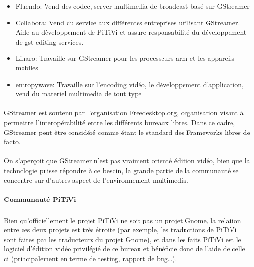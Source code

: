 \begin{itemize}

  \item {Fluendo: Vend des codec, server multimedia de broadcast basé
  sur GStreamer}

  \item {Collabora: Vend du service aux différentes entreprises utilisant
  GStreamer.
    Aide au développement de PiTiVi et assure responsabilité du
    développement de gst-editing-services.}

  \item {Linaro: Travaille sur GStreamer pour les processeurs arm et
  les appareils mobiles}

  \item {entropywave: Travaille sur l'encoding vidéo, le développement
  d'application, vend du materiel multimedia de tout type}

\end{itemize}

\paragraph{}

GStreamer est soutenu par l'organisation Freedesktop.org, organisation
visant à permettre l'interopérabilité entre les différents bureaux
libres. Dans ce cadre, GStreamer peut être considéré comme étant le
standard des Frameworks libres de facto.

\paragraph{}

On s'aperçoit que GStreamer n'est pas vraiment orienté édition vidéo,
bien que la technologie puisse répondre à ce besoin, la grande partie
de la communauté se concentre sur d'autres aspect de l'environnement
multimedia.

\paragraph{Communauté PiTiVi}

\subparagraph{}

Bien qu'officiellement le projet PiTiVi ne soit pas un projet Gnome,
la relation entre ces deux projets est très étroite (par exemple, les
traductions de PiTiVi sont faites par les traducteurs du projet Gnome),
et dans les faits PiTiVi est le logiciel d'édition vidéo privilégié
de ce bureau et bénéficie donc de l'aide de celle ci (principalement
en terme de testing, rapport de bug\ldots).

